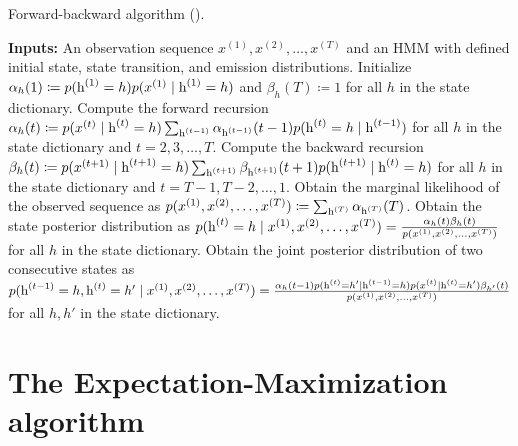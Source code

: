 \begin{algorithm}
    \caption{Forward-backward algorithm (\citet{Rabiner1986}).}
    \label{alg:forward_backward}
    \begin{algorithmic}[1]
        \State \textbf{Inputs:} An observation sequence $x^{(1)}, x^{(2)}, \dots, x^{(T)}$ and an HMM with defined initial state, state transition, and emission distributions.
        \vspace{0.3cm}
        \State Initialize $\alpha_h(1) \coloneqq p({\textnormal{h}}^{(1)}=h)p(x^{(1)} \mid {\textnormal{h}}^{(1)}=h)$ and $\beta_h(T) \coloneqq 1$ for all $h$ in the state dictionary.
        \vspace{0.3cm}
        \State Compute the forward recursion $\alpha_h(t) \coloneqq p(x^{(t)} \mid {\textnormal{h}}^{(t)}=h) \sum_{{\textnormal{h}}^{(t-1)}} \alpha_{{\textnormal{h}}^{(t-1)}}(t-1) p({\textnormal{h}}^{(t)}=h \mid {\textnormal{h}}^{(t-1)})$ for all $h$ in the state dictionary and $t=2, 3, \dots, T$.
        \vspace{0.3cm}
        \State Compute the backward recursion $\beta_h(t) \coloneqq p(x^{(t+1)} \mid {\textnormal{h}}^{(t+1)}=h) \sum_{{\textnormal{h}}^{(t+1)}} \beta_{{\textnormal{h}}^{(t+1)}}(t+1) p({\textnormal{h}}^{(t+1)} \mid {\textnormal{h}}^{(t)}=h) $ for all $h$ in the state dictionary and $t=T-1, T-2, \dots, 1$.
        \vspace{0.3cm}
        \State Obtain the marginal likelihood of the observed sequence as $p(x^{(1)}, x^{(2)}, \dots, x^{(T)}) \coloneqq \sum_{{\textnormal{h}}^{(T)}} \alpha_{{\textnormal{h}}^{(T)}}(T)$.
        \vspace{0.3cm}
        \State Obtain the state posterior distribution as $p({\textnormal{h}}^{(t)}=h \mid x^{(1)}, x^{(2)}, \dots, x^{(T)}) = \frac{\alpha_h(t)\beta_h(t)}{p(x^{(1)}, x^{(2)}, \dots, x^{(T)})}$ for all $h$ in the state dictionary.
        \vspace{0.3cm}
        \State Obtain the joint posterior distribution of two consecutive states as $p({\textnormal{h}}^{(t-1)}=h, {\textnormal{h}}^{(t)}=h' \mid x^{(1)}, x^{(2)}, \dots, x^{(T)}) = \frac{\alpha_h(t-1)p({\textnormal{h}}^{(t)}=h' \mid {\textnormal{h}}^{(t-1)}=h) p(x^{(t)} \mid {\textnormal{h}}^{(t)}=h')\beta_{h'}(t)}{p(x^{(1)}, x^{(2)}, \dots, x^{(T)})}$ for all $h,h'$ in the state dictionary.
    \end{algorithmic}
\end{algorithm}

\section{The Expectation-Maximization algorithm}
\label{sec:expectation_maximization}

